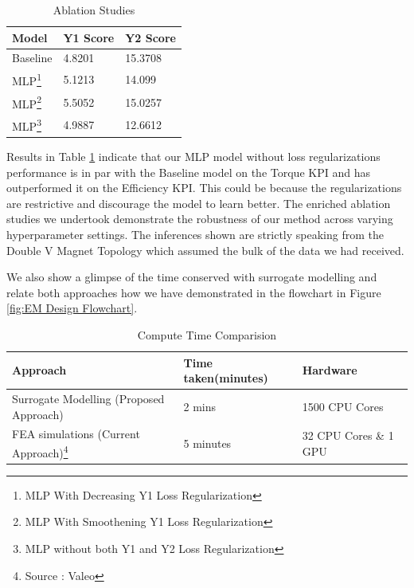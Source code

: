 \documentclass{report} %
\begin{document}
\begin{minipage}[t]{\textwidth}
    \begin{table}[H]
        \centering
        \begin{tabular}{|p{}|p{}|p{}|}
        \hline {\bf Model} & {\bf Y1 Score} & {\bf Y2 Score}\\
        \hline 
        Baseline & 4.8201 & 15.3708 \\
        MLP\footnote{MLP With Decreasing Y1 Loss Regularization} & 5.1213 & 14.099 \\
        MLP\footnote{MLP With Smoothening Y1 Loss Regularization} & 5.5052 & 15.0257 \\
        MLP\footnote{MLP without both Y1 and Y2 Loss Regularization} & 4.9887 & 12.6612  \\
        \hline
        \end{tabular}
        \caption{Ablation Studies}
        \label{tab:Ablation Studies}
    \end{table}
\end{minipage}

\vspace{1em} %

Results in Table \ref{tab:Ablation Studies} indicate that our \ac{MLP} model without loss regularizations performance is in par with the Baseline model on the Torque 
\ac{KPI} and has outperformed it on the Efficiency \ac{KPI}. This could be because the regularizations are restrictive and discourage the model to learn better.
The enriched ablation studies we undertook demonstrate the robustness of our method across varying hyperparameter settings.
The inferences shown are strictly speaking from the Double V Magnet Topology which assumed the bulk of the data we had received.

We also show a glimpse of the time conserved with surrogate modelling and relate both approaches how we have demonstrated in the flowchart in Figure 
\ref{fig:EM Design Flowchart}.

\begin{minipage}[t]{\textwidth}
    \begin{table}[H]
        \centering
        \begin{tabular}{|p{}|p{}|p{}|}
        \hline {\bf Approach} & {\bf Time taken(minutes)} & {\bf Hardware}\\
        \hline 
        Surrogate Modelling (Proposed Approach) & 2 mins & 1500 CPU Cores\\
        \ac{FEA} simulations (Current Approach)\footnote{Source : Valeo} & 5 minutes & 32 CPU Cores \& 1 GPU\\
        \hline
        \end{tabular}
        \caption{Compute Time Comparision}
        \label{tab:Compute Time Comparisions}
    \end{table}
\end{minipage}
\end{document}
